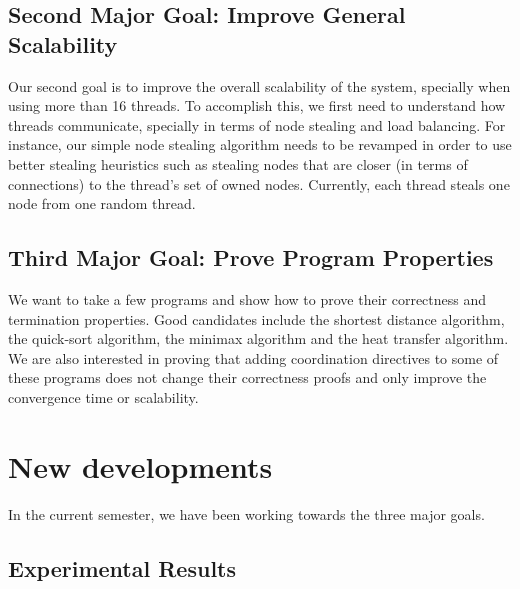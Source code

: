 \documentclass[10pt]{article}
\begin{document}
\subsection{Second Major Goal: Improve General Scalability}

Our second goal is to improve the overall scalability of the system, specially
when using more than 16 threads. To accomplish this, we first need to understand
how threads communicate, specially in terms of node stealing and load balancing.
For instance, our simple node stealing algorithm needs to be revamped in order
to use better stealing heuristics such as stealing nodes that are closer (in
terms of connections) to the thread's set of owned nodes. Currently, each
thread steals one node from one random thread.

\subsection{Third Major Goal: Prove Program Properties}

We want to take a few programs and show how to prove their correctness and
termination properties.  Good candidates include the shortest distance
algorithm, the quick-sort algorithm, the minimax algorithm and the heat transfer
algorithm. We are also interested in proving that adding coordination directives
to some of these programs does not change their correctness proofs and only
improve the convergence time or scalability.

\section{New developments}

In the current semester, we have been working towards the three major goals.

\subsection{Experimental Results}
\end{document}
